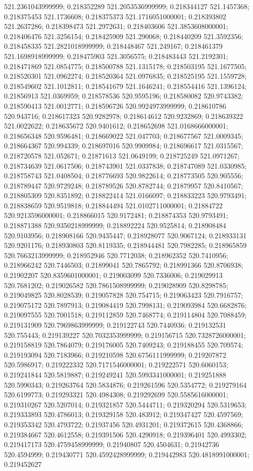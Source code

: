521.2361043999999; 0.218352289 521.2053536999999; 0.218344127 521.1457368; 0.218375453 521.1736608; 0.218375373 521.1716051000001; 0.218393802 521.2637286; 0.218398473 521.2972631; 0.218403606 521.3853608000001; 0.218406476 521.3256154; 0.218425909 521.290068; 0.218440209 521.3592356; 0.218458335 521.2821018999999; 0.218448467 521.249167; 0.218461379 521.1698918999999; 0.218475903 521.3056575; 0.218483443 521.2192301; 0.218471869 521.0854775; 0.218500788 521.1315178; 0.218503195 521.1677505; 0.218520301 521.0962274; 0.218520364 521.0976835; 0.218525195 521.1559728; 0.218549602 521.1012811; 0.218541679 521.1646241; 0.218554416 521.1396124; 0.21856913 521.0369959; 0.218578536 520.9595196; 0.218580082 520.9743382; 0.218590413 521.0012771; 0.218596726 520.9924973999999; 0.218610786 520.943716; 0.218617323 520.9282978; 0.218614612 520.9232869; 0.218639322 521.0022622; 0.218635672 520.9401612; 0.218652698 521.0168666000001; 0.218656348 520.9596481; 0.218669022 521.047703; 0.218677567 521.0009345; 0.218664367 520.994339; 0.218697016 520.9909984; 0.218696617 521.0315567; 0.218720578 521.052671; 0.21871613 521.0649199; 0.218725249 521.0971267; 0.218734639 521.0617506; 0.218743901 521.0337838; 0.218747089 521.0330985; 0.218758743 521.0408504; 0.218776693 520.9822614; 0.218773505 520.905556; 0.218789447 520.9729248; 0.218789526 520.8782744; 0.21879957 520.8410567; 0.218805309 520.8351892; 0.218822414 521.0166097; 0.218833223 520.9793491; 0.218838659 520.9519818; 0.218844494 521.0102711000001; 0.21884722 520.9213596000001; 0.218866015 520.9172481; 0.218874353 520.9793491; 0.218871388 520.9350218999999; 0.218892224 520.9525814; 0.218908484 520.9103956; 0.218908166 520.9435447; 0.218928077 520.9067124; 0.218933131 520.9201176; 0.218930803 520.8119335; 0.218944481 520.7982285; 0.218965859 520.7663213999999; 0.218952946 520.7712038; 0.218962352 520.7410956; 0.218966242 520.7446503; 0.21899041 520.7865792; 0.218991366 520.8706938; 0.21902207 520.8359601000001; 0.219003099 520.7336006; 0.219029913 520.7681202; 0.219026582 520.7861508999999; 0.219028909 520.8298785; 0.219049825 520.8028539; 0.219057828 520.754715; 0.219063423 520.7916757; 0.219075172 520.7897913; 0.219084419 520.7998131; 0.219093984 520.6682876; 0.219097555 520.7001518; 0.219112859 520.7468774; 0.219114804 520.7088459; 0.219131909 520.7969863999999; 0.219122743 520.7440936; 0.219132531 520.755443; 0.219139227 520.7032353999999; 0.219156715 520.7328726000001; 0.219158819 520.7864079; 0.219176005 520.7409243; 0.219188455 520.709574; 0.219193094 520.7183966; 0.219210598 520.6756111999999; 0.219207872 520.5986917; 0.219222332 520.7171546000001; 0.219222571 520.6060153; 0.219241844 520.5819887; 0.219249241 520.5993341000001; 0.219251888 520.5990343; 0.219263764 520.5834876; 0.219261596 520.5354772; 0.219279164 520.6199773; 0.219293321 520.4984308; 0.219292699 520.5585616000001; 0.219310267 520.5207014; 0.219321857 520.5444711; 0.219320294 520.5319653; 0.219333893 520.4786013; 0.219329158 520.483912; 0.219347427 520.4597569; 0.219353342 520.4793722; 0.21937456 520.4931201; 0.219372615 520.4368866; 0.219384667 520.4612558; 0.219391506 520.4290918; 0.219396401 520.4993302; 0.219417173 520.4759458999999; 0.21940807 520.4504631; 0.21942736 520.4594999; 0.219430771 520.4592428999999; 0.219442983 520.4818991000001; 0.219452627 